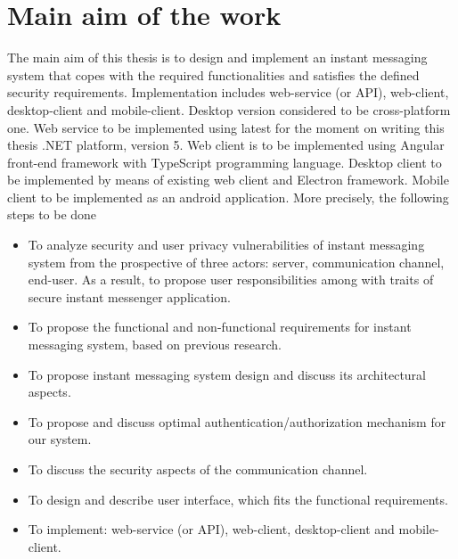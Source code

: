 \chapter{Main aim of the work}\label{ch:main-aim-of-the-work}

The main aim of this thesis is to design and implement an instant messaging system
that copes with the required functionalities and satisfies the defined security requirements.
Implementation includes web-service (or API), web-client, desktop-client and mobile-client.
Desktop version considered to be cross-platform one.
Web service to be implemented using latest for the moment on writing this thesis .NET platform, version 5.
Web client is to be implemented using Angular front-end framework with TypeScript programming language.
Desktop client to be implemented by means of existing web client and Electron framework.
Mobile client to be implemented as an android application.
More precisely, the following steps to be done
\begin{itemize}
    \item To analyze security and user privacy vulnerabilities of instant messaging system from the prospective of three
    actors: server, communication channel, end-user.
    As a result, to propose user responsibilities among with traits of secure instant messenger application.
    \item To propose the functional and non-functional requirements for instant messaging system, based on previous
    research.
    \item To propose instant messaging system design and discuss its architectural aspects.
    \item To propose and discuss optimal authentication/authorization mechanism for our system.
    \item To discuss the security aspects of the communication channel.
    \item To design and describe user interface, which fits the functional requirements.
    \item To implement: web-service (or API), web-client, desktop-client and mobile-client.
\end{itemize}